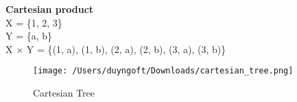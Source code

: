 \documentclass{amsart}
\begin{document}
\begin{flushleft}
  \textbf{Cartesian product}\\[20pt]
  X = \{1, 2, 3\}\\
  Y = \{a, b\}\\
  X $\times$ Y = \{(1, a), (1, b), (2, a), (2, b), (3, a), (3, b)\}\\
\end{flushleft}
\begin{figure}[h]
  \centering
  \texttt{[image: /Users/duyngoft/Downloads/cartesian\_tree.png]}
  \caption{Cartesian Tree}
\end{figure}
\end{document}
